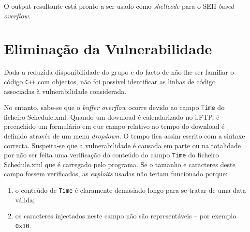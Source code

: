 \documentclass[11pt,a4paper]{article}
\begin{document}
O output resultante está pronto a ser usado como \textit{shellcode} para o SEH \textit{based overflow}.


\section{Eliminação da Vulnerabilidade}
\label{sec:vulnerability}

Dada a reduzida disponibilidade do grupo e do facto de não lhe ser familiar o código \texttt{C++} com objectos, não foi possível identificar as linhas de código associadas à vulnerabilidade considerada.

No entanto, sabe-se que o \textit{buffer overflow} ocorre devido ao campo \texttt{Time} do ficheiro Schedule.xml. Quando um download é calendarizado no i.FTP, é preenchido um formulário em que campo relativo ao tempo do download é definido através de um menu \textit{dropdown}. O tempo fica assim escrito com a sintaxe correcta. Suspeita-se que a vulnerabilidade é causada em parte ou na totalidade por não ser feita uma verificação do conteúdo do campo \texttt{Time} do ficheiro Schedule.xml que é carregado pelo programa. Se o tamanho e caracteres deste campo fossem verificados, as \textit{exploits} usadas não teriam funcionado porque:

\begin{enumerate}
	\item o conteúdo de \texttt{Time} é claramente demasiado longo para se tratar de uma data válida;
	\item os caracteres injectados neste campo não são representáveis -- por exemplo \texttt{0x10}.
\end{enumerate}


\pagebreak

\nocite{CorelanTeam, refx86asm, genSEHexploits, AMD64vol3_2013}
\end{document}
